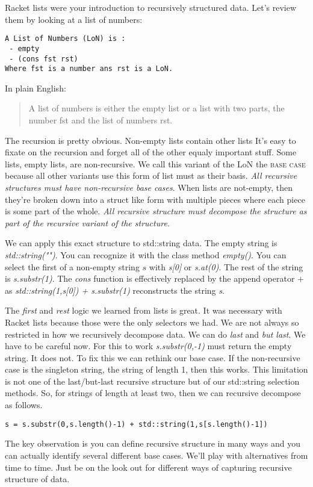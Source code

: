 \documentclass[]{tufte-handout}
\begin{document}
Racket lists were your introduction to recursively structured data. Let's review them by looking at a list of numbers:
\begin{verbatim}
A List of Numbers (LoN) is :
 - empty
 - (cons fst rst)
Where fst is a number ans rst is a LoN.
\end{verbatim}
In plain English:
\begin{quote}
A list of numbers is either the empty list or a list with two parts, the number fst and the list of numbers rst.
\end{quote}
The recursion is pretty obvious. Non-empty lists contain other lists It's easy to fixate on the recursion and forget all of the other equaly important stuff. Some lists, empty lists, are non-recursive. We call this variant of the LoN the \textsc{base case} because all other variants use this form of list must as their basis. \textit{All recursive structures must have non-recursive base cases}. When lists are not-empty, then they're broken down into a struct like form with multiple pieces where each piece is some part of the whole. \textit{All recursive structure must decompose the structure as part of the recursive variant of the structure.} 

We can apply this exact structure to std::string data. The empty string is \textit{std::string("")}. You can recognize it with the class method \textit{empty()}. You can select the first of a non-empty string $s$ with \textit{s[0]} or \textit{s.at(0)}. The rest of the string is \textit{s.substr(1)}.  The \textit{cons} function is effectively replaced by the append operator $+$ as \textit{std::string(1,s[0]) + s.substr(1)} reconstructs the string \textit{s}. 

The \textit{first} and \textit{rest} logic we learned from lists is great. It was necessary with Racket lists because those were the only selectors we had.  We are not always so restricted in how we recursively decompose data.  We can do \textit{last} and \textit{but last}. We have to be careful now. For this to work \textit{s.substr(0,-1)} must return the empty string. It does not. To fix this we can rethink our base case. If the non-recursive case is the singleton string, the string of length 1, then this works. This limitation is not one of the last/but-last recursive structure but of our std::string selection methods. So, for strings of length at least two, then we can recursive decompose as follows.
\begin{verbatim}
s = s.substr(0,s.length()-1) + std::string(1,s[s.length()-1])
\end{verbatim}    
The key observation is you can define recursive structure in many ways and you can actually identify several different base cases.  We'll play with alternatives from time to time. Just be on the look out for different ways of capturing recursive structure of data. 
\end{document}
